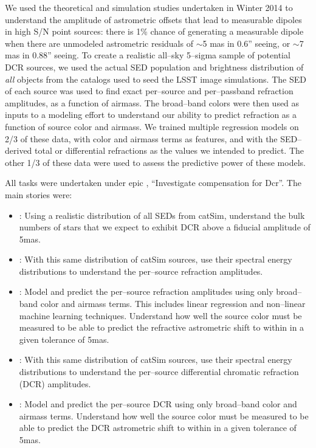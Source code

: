 \documentclass[DM,toc]{lsstdoc}
\begin{document}
We used the theoretical and simulation studies undertaken in Winter
2014 
to understand the amplitude of astrometric offsets that lead to
measurable dipoles in high S/N point sources: there is 1\% chance of
generating a measurable dipole when there are unmodeled astrometric
residuals of $\sim$5 mas in 0.6'' seeing, or $\sim$7 mas in 0.88''
seeing.  To create a realistic all--sky 5--sigma sample of potential
DCR sources, we used the actual SED population and brightness
distribution of \emph{all} objects from the catalogs used to seed the
LSST image simulations.  The SED of each source was used to find exact
per--source and per--passband refraction amplitudes, as a function of
airmass.  The broad--band colors were then used as inputs to a
modeling effort to understand our ability to predict refraction as a
function of source color and airmass.  We trained multiple regression
models on 2/3 of these data, with color and airmass terms as features,
and with the SED--derived total or differential refractions as the
values we intended to predict.  The other 1/3 of these data were used
to assess the predictive power of these models.

All tasks were undertaken under epic , ``Investigate
compensation for Dcr''.  The main stories were:

\begin{itemize}

\item {}: Using a realistic distribution of all SEDs from
  catSim, understand the bulk numbers of stars that we expect to
  exhibit DCR above a fiducial amplitude of 5mas.

\item {}: With this same distribution of catSim sources, use
  their spectral energy distributions to understand the per--source
  refraction amplitudes.

\item {}: Model and predict the per--source refraction
  amplitudes using only broad--band color and airmass terms.  This
  includes linear regression and non--linear machine learning
  techniques.  Understand how well the source color must be measured
  to be able to predict the refractive astrometric shift to within in
  a given tolerance of 5mas.

\item {}: With this same distribution of catSim sources, use
  their spectral energy distributions to understand the per--source
  differential chromatic refraction (DCR) amplitudes.

\item {}: Model and predict the per--source DCR using only
  broad--band color and airmass terms.  Understand how well the source
  color must be measured to be able to predict the DCR astrometric
  shift to within in a given tolerance of 5mas.

\end{itemize}
\end{document}

